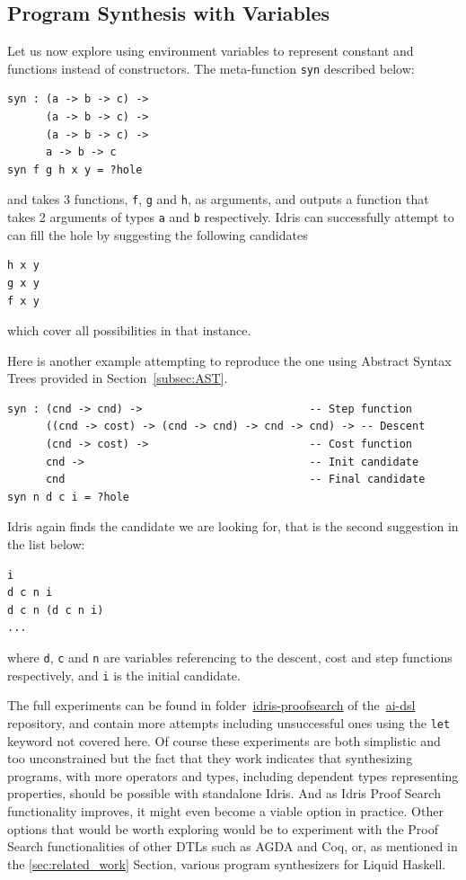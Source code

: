 \documentclass[]{report}
\begin{document}
\subsection{Program Synthesis with Variables}
Let us now explore using environment variables to represent constant
and functions instead of constructors.  The meta-function \texttt{syn}
described below:
\begin{verbatim}
syn : (a -> b -> c) ->
      (a -> b -> c) ->
      (a -> b -> c) ->
      a -> b -> c
syn f g h x y = ?hole
\end{verbatim}
and takes 3 functions, \texttt{f}, \texttt{g} and \texttt{h}, as
arguments, and outputs a function that takes 2 arguments of types
\texttt{a} and \texttt{b} respectively.  Idris can successfully
attempt to can fill the hole by suggesting the following candidates
\begin{verbatim}
h x y
g x y
f x y
\end{verbatim}
which cover all possibilities in that instance.

Here is another example attempting to reproduce the one using Abstract
Syntax Trees provided in Section~\ref{subsec:AST}.
\begin{verbatim}
syn : (cnd -> cnd) ->                          -- Step function
      ((cnd -> cost) -> (cnd -> cnd) -> cnd -> cnd) -> -- Descent
      (cnd -> cost) ->                         -- Cost function
      cnd ->                                   -- Init candidate
      cnd                                      -- Final candidate
syn n d c i = ?hole
\end{verbatim}
Idris again finds the candidate we are looking for, that is the second
suggestion in the list below:
\begin{verbatim}
i
d c n i
d c n (d c n i)
...
\end{verbatim}
where \texttt{d}, \texttt{c} and \texttt{n} are variables referencing
to the descent, cost and step functions respectively, and \texttt{i}
is the initial candidate.

The full experiments can be found in
folder~\href{https://github.com/singnet/ai-dsl/blob/master/experimental/program-synthesis/idris-proofsearch}{idris-proofsearch}
of the~\href{https://github.com/singnet/ai-dsl}{ai-dsl} repository,
and contain more attempts including unsuccessful ones using the
\texttt{let} keyword not covered here.  Of course these experiments
are both simplistic and too unconstrained but the fact that they work
indicates that synthesizing programs, with more operators and types,
including dependent types representing properties, should be possible
with standalone Idris.  And as Idris Proof Search functionality
improves, it might even become a viable option in practice.  Other
options that would be worth exploring would be to experiment with the
Proof Search functionalities of other DTLs such as AGDA and Coq, or,
as mentioned in the \ref{sec:related_work} Section, various program
synthesizers for Liquid Haskell.
\end{document}
